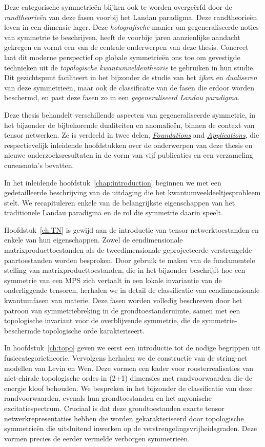 Deze categorische symmetrie\"en blijken ook te worden overge\"erfd door de \emph{randtheorie\"en} van deze fasen voorbij het Landau paradigma. Deze randtheorie\"en leven in een dimensie lager. Deze \emph{holografische} manier om gegeneraliseerde noties van symmetrie te beschrijven, heeft de voorbije jaren aanzienlijke aandacht gekregen en vormt een van de centrale onderwerpen van deze thesis. Concreet laat dit moderne perspectief op globale symmetrie\"en ons toe om gevestigde technieken uit de \emph{topologische kwantumveldentheorie} te gebruiken in hun studie. Dit gezichtspunt faciliteert in het bijzonder de studie van het \emph{ijken} en \emph{dualiseren} van deze symmetrie\"en, maar ook de classificatie van de fasen die erdoor worden beschermd, en past deze fasen zo in een \emph{gegeneraliseerd Landau paradigma}.

\bigskip\noindent Deze thesis behandelt verschillende aspecten van gegeneraliseerde symmetrie, in het bijzonder de bijbehorende dualiteiten en anomalie\"en, binnen de context van tensor netwerken. Ze is verdeeld in twee delen, \hyperref[part:Foundations]{\emph{Foundations}} and \hyperref[part:Applications]{\emph{Applications}}, die respectievelijk inleidende hoofdstukken over de onderwerpen van deze thesis en nieuwe onderzoeksresultaten in de vorm van vijf publicaties en een verzameling cursusnota's bevatten.

In het inleidende hoofdstuk~\ref{chap:introduction} beginnen we met een gedetailleerde beschrijving van de uitdaging die het kwantumveeldeeltjesprobleem stelt. We recapituleren enkele van de belangrijkste eigenschappen van het traditionele Landau paradigma en de rol die symmetrie daarin speelt.

Hoofdstuk~\ref{ch:TN} is gewijd aan de introductie van tensor netwerktoestanden en enkele van hun eigenschappen. Zowel de eendimensionale matrixproducttoestanden als de tweedimensionale geprojecteerde verstrengelde-paartoestanden worden besproken. Door gebruik te maken van de fundamentele stelling van matrixproducttoestanden, die in het bijzonder beschrijft hoe een symmetrie van een MPS zich vertaalt in een lokale invariantie van de onderliggende tensoren, herhalen we in detail de classificatie van eendimensionale kwantumfasen van materie. Deze fasen worden volledig beschreven door het patroon van symmetriebreking in de grondtoestandsruimte, samen met een topologische invariant voor de overblijvende symmetrie, die de symmetrie-beschermde topologische orde karakteriseert.

In hoofdstuk~\ref{ch:topo} geven we eerst een introductie tot de nodige begrippen uit fusiecategorietheorie. Vervolgens herhalen we de constructie van de string-net modellen van Levin en Wen. Deze vormen een kader voor roosterrealisaties van niet-chirale topologische ordes in (2+1) dimensies met randvoorwaarden die de energie kloof behouden. We bespreken in het bijzonder de classificatie van deze randvoorwaarden, evenals hun grondtoestanden en het anyonische excitatiespectrum. Cruciaal is dat deze grondtoestanden exacte tensor netwerkrepresentaties hebben die worden gekarakteriseerd door topologische symmetrie\"en die uitsluitend inwerken op de verstrengelingsvrijheidsgraden. Deze vormen precies de eerder vermelde verborgen symmetrie\"en.

